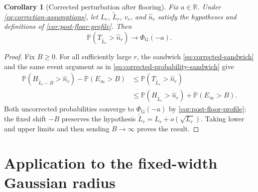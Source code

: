 \documentclass[10pt,reqno,a4paper]{amsart}
\numberwithin{equation}{section}
\theoremstyle{plain}
\newtheorem{corollary}[theorem]{Corollary}
\theoremstyle{definition}
\theoremstyle{remark}
\newcommand{\R}{\mathbb{R}}
\newcommand{\Pp}{\mathbb{P}}
\newcommand{\1}{\mathbf{1}}
\begin{document}
\begin{corollary}[Corrected perturbation after flooring]
\label{cor:corrected-post-floor-profile}
  Fix $a\in\R$.  Under \cref{eq:correction-assumptions}, let $L_r$,
  $\widetilde L_r$, $v_r$, and $\widehat n_r$ satisfy the hypotheses and definitions of
  \cref{cor:post-floor-profile}.  Then
  \begin{equation}\label{eq:corrected-post-floor-profile}
    \Pp(T_{\widetilde L_r}>\widehat n_r)
    \longrightarrow
    \Phi_{\mathrm G}(-a).
  \end{equation}
\end{corollary}

\begin{proof}
  Fix $B\geq0$.  For all sufficiently large $r$, the sandwich
  \cref{eq:corrected-sandwich} and the same event argument as in
  \cref{eq:corrected-probability-sandwich} give
  \begin{align*}
    \Pp(H_{\widetilde L_r-B}>\widehat n_r)-\Pp(E_\infty>B)
    &\leq \Pp(T_{\widetilde L_r}>\widehat n_r)\\
    &\leq
    \Pp(H_{\widetilde L_r}>\widehat n_r)+\Pp(E_\infty>B).
  \end{align*}
  Both uncorrected probabilities converge to
  $\Phi_{\mathrm G}(-a)$ by \cref{cor:post-floor-profile}; the fixed shift
  $-B$ preserves the hypothesis
  $\widetilde L_r=L_r+o(\sqrt{L_r})$.  Taking lower and upper limits and then
  sending $B\to\infty$ proves the result.
\end{proof}

\section{Application to the fixed-width Gaussian radius}
\label{sec:gaussian-application}
\end{document}
